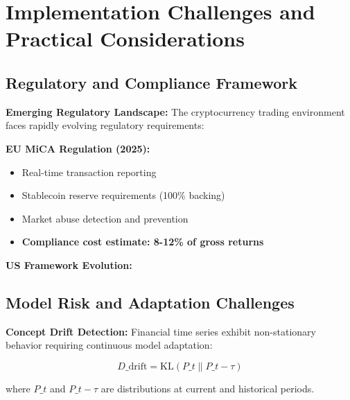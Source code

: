 \documentclass[11pt,a4paper]{article}
\begin{document}
\section{Implementation Challenges and Practical Considerations}

\subsection{Regulatory and Compliance Framework}

\textbf{Emerging Regulatory Landscape:}
The cryptocurrency trading environment faces rapidly evolving regulatory requirements:

\textbf{EU MiCA Regulation (2025):}
\begin{itemize}
\item Real-time transaction reporting
\item Stablecoin reserve requirements (100\% backing)
\item Market abuse detection and prevention
\item \textbf{Compliance cost estimate: 8-12\% of gross returns}

\end{itemize}
\textbf{US Framework Evolution:}
\subsection{Model Risk and Adaptation Challenges}

\textbf{Concept Drift Detection:}
Financial time series exhibit non-stationary behavior requiring continuous model adaptation:

\begin{equation}
D\_{\text{drift}} = \text{KL}(P\_t \| P\_{t-\tau})
\end{equation}

where $P\_t$ and $P\_{t-\tau}$ are distributions at current and historical periods.
\end{document}
